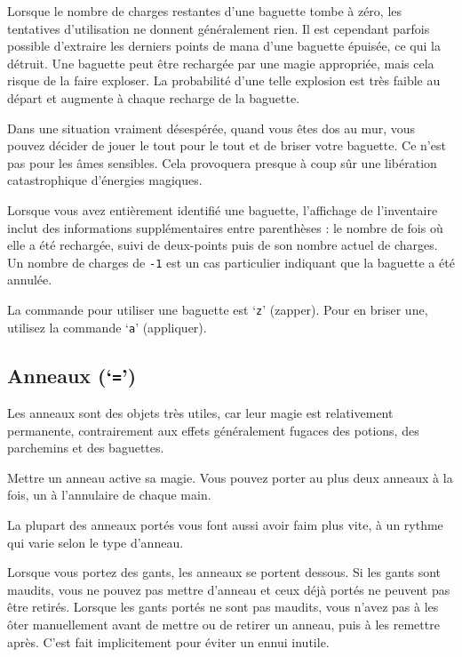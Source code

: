 \documentclass[titlepage]{article}
\begin{document}
Lorsque le nombre de charges restantes d'une baguette tombe à zéro, les tentatives
d'utilisation ne donnent généralement rien.  Il est cependant parfois
possible d'extraire les derniers points de mana d'une baguette épuisée,
ce qui la détruit.  Une baguette peut être rechargée par une magie
appropriée, mais cela risque de la faire exploser.  La probabilité
d'une telle explosion est très faible au départ et augmente à chaque
recharge de la baguette.

Dans une situation vraiment désespérée, quand vous êtes dos au mur, vous
pouvez décider de jouer le tout pour le tout et de briser votre baguette.  Ce n'est
pas pour les âmes sensibles.  Cela provoquera presque à coup sûr une libération
catastrophique d'énergies magiques.

Lorsque vous avez entièrement identifié une baguette, l'affichage de l'inventaire
inclut des informations supplémentaires entre parenthèses : le nombre de fois
où elle a été rechargée, suivi de deux-points puis de son nombre actuel de charges.
Un nombre de charges de \texttt{-1} est un cas particulier indiquant que la baguette
a été annulée.

La commande pour utiliser une baguette est `\texttt{z}' (zapper).  Pour en briser une, utilisez la commande `\texttt{a}'
(appliquer).

\subsection*{Anneaux (`\texttt{=}')}

Les anneaux sont des objets très utiles, car leur magie est relativement
permanente, contrairement aux effets généralement fugaces des potions, des
parchemins et des baguettes.

Mettre un anneau active sa magie.
Vous pouvez porter au plus deux anneaux à la fois, un à l'annulaire de
chaque main.

La plupart des anneaux portés vous font aussi avoir faim plus vite, à un rythme
qui varie selon le type d'anneau.

Lorsque vous portez des gants, les anneaux se portent dessous.
Si les gants sont maudits, vous ne pouvez pas mettre d'anneau et ceux déjà
portés ne peuvent pas être retirés.
Lorsque les gants portés ne sont pas maudits, vous n'avez pas à les ôter
manuellement avant de mettre ou de retirer un anneau, puis à les remettre après.
C'est fait implicitement pour éviter un ennui inutile.
\end{document}
